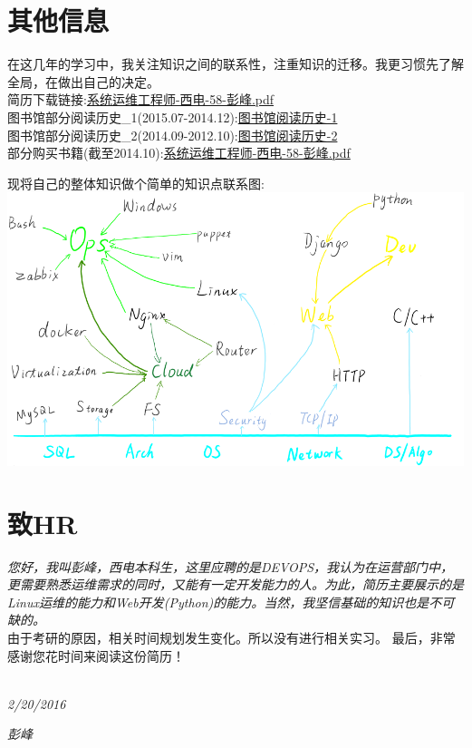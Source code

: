 \documentclass[]{friggeri-cv}
\begin{document}
\section{其他信息}
在这几年的学习中，我关注知识之间的联系性，注重知识的迁移。我更习惯先了解全局，在做出自己的决定。\\
{简历下载链接:\href{http://fengidea.qiniudn.com/系统运维工程师-西电-58-彭峰.pdf}{系统运维工程师-西电-58-彭峰.pdf}}\\
{图书馆部分阅读历史\_1(2015.07-2014.12):\href{http://fengidea.qiniudn.com/feng-read-xidian-1.pdf}{图书馆阅读历史-1}}\\
{图书馆部分阅读历史\_2(2014.09-2012.10):\href{http://fengidea.qiniudn.com/feng-read-xidian-2.pdf}{图书馆阅读历史-2}}\\
{部分购买书籍(截至2014.10):\href{http://fengidea.qiniudn.com/feng-read-xidian-3.pdf}{系统运维工程师-西电-58-彭峰.pdf}}

现将自己的整体知识做个简单的知识点联系图:\\
\includegraphics[scale=0.60]{img/devopsgraph.png}

\section{致HR}
\emph{您好，我叫彭峰，西电本科生，这里应聘的是DEVOPS，我认为在运营部门中，更需要熟悉运维需求的同时，又能有一定开发能力的人。为此，简历主要展示的是Linux运维的能力和Web开发(Python)的能力。当然，我坚信基础的知识也是不可缺的。\\}
由于考研的原因，相关时间规划发生变化。所以没有进行相关实习。
最后，非常感谢您花时间来阅读这份简历！\\
~
\begin{flushleft}
\emph{2/20/2016}
\end{flushleft}
\begin{flushright}
\emph{彭峰}
\end{flushright}
\end{document}

